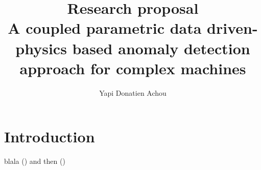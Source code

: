 \documentclass[10pt,a4paper]{article}
\author{Yapi Donatien Achou}
\title{\textbf{Research proposal} \\A coupled parametric data driven-physics based anomaly detection approach for complex machines}
\begin{document}
\maketitle

\section{Introduction}
blala (\cite{albrecht1986}) and then (\cite{albrecht1986})


%
\printbibliography
\end{document}
